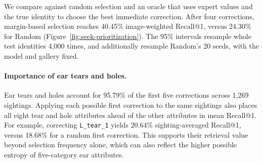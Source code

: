 We compare against random selection and an oracle that uses expert values and the true identity to choose the best immediate correction. After four corrections, margin-based selection reaches 40.45\% image-weighted Recall@1, versus 24.30\% for Random (Figure~\ref{fig:seek-prioritization}). The 95\% intervals resample whole test identities 4,000 times, and additionally resample Random's 20 seeds, with the model and gallery fixed.

\paragraph{Importance of ear tears and holes.}
Ear tears and holes account for 95.79\% of the first five corrections across 1,269 sightings. Applying each possible first correction to the same sightings also places all eight tear and hole attributes ahead of the other attributes in mean Recall@1. For example, correcting \texttt{L\_tear\_1} yields 20.64\% sighting-averaged Recall@1, versus 18.68\% for a random first correction. This supports their retrieval value beyond selection frequency alone, which can also reflect the higher possible entropy of five-category ear attributes.
